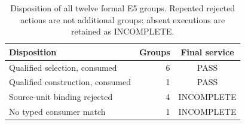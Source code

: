\begin{table}[htbp]
\centering\small
\caption{Disposition of all twelve formal E5 groups. Repeated rejected actions are not additional groups; absent executions are retained as INCOMPLETE.}
\label{tab:e5}
\begin{tabular}{@{}lrc@{}}\toprule
Disposition & Groups & Final service \\\midrule
Qualified selection, consumed & 6 & PASS \\
Qualified construction, consumed & 1 & PASS \\
Source-unit binding rejected & 4 & INCOMPLETE \\
No typed consumer match & 1 & INCOMPLETE \\
\bottomrule\end{tabular}
\end{table}
